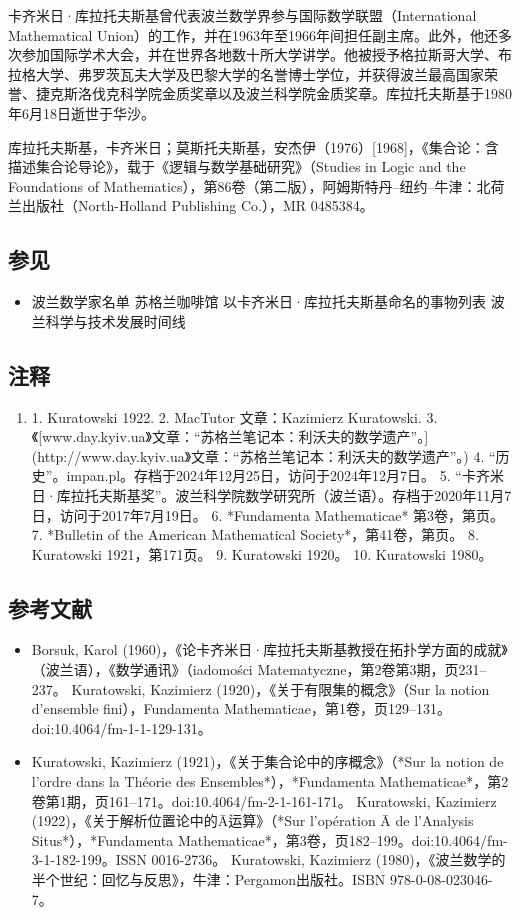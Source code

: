 卡齐米日·库拉托夫斯基曾代表波兰数学界参与国际数学联盟（International Mathematical Union）的工作，并在1963年至1966年间担任副主席。此外，他还多次参加国际学术大会，并在世界各地数十所大学讲学。他被授予格拉斯哥大学、布拉格大学、弗罗茨瓦夫大学及巴黎大学的名誉博士学位，并获得波兰最高国家荣誉、捷克斯洛伐克科学院金质奖章以及波兰科学院金质奖章。库拉托夫斯基于1980年6月18日逝世于华沙。

库拉托夫斯基，卡齐米日；莫斯托夫斯基，安杰伊（1976）[1968]，《集合论：含描述集合论导论》，载于《逻辑与数学基础研究》（Studies in Logic and the Foundations of Mathematics），第86卷（第二版），阿姆斯特丹–纽约–牛津：北荷兰出版社（North-Holland Publishing Co.），MR 0485384。
\subsection{参见}
\begin{itemize}
\item 波兰数学家名单
苏格兰咖啡馆
以卡齐米日·库拉托夫斯基命名的事物列表
波兰科学与技术发展时间线
\end{itemize}
\subsection{注释}
\begin{enumerate}
\item 1. Kuratowski 1922.
2. MacTutor 文章：Kazimierz Kuratowski.
3. 《[www.day.kyiv.ua》文章：“苏格兰笔记本：利沃夫的数学遗产”。](http://www.day.kyiv.ua》文章：“苏格兰笔记本：利沃夫的数学遗产”。)
4. “历史”。impan.pl。存档于2024年12月25日，访问于2024年12月7日。
5. “卡齐米日·库拉托夫斯基奖”。波兰科学院数学研究所（波兰语）。存档于2020年11月7日，访问于2017年7月19日。
6. *Fundamenta Mathematicae* 第3卷，第页。
7. *Bulletin of the American Mathematical Society*，第41卷，第页。
8. Kuratowski 1921，第171页。
9. Kuratowski 1920。
10. Kuratowski 1980。
\end{enumerate}
\subsection{参考文献}
\begin{itemize}
\item Borsuk, Karol (1960)，《论卡齐米日·库拉托夫斯基教授在拓扑学方面的成就》（波兰语），《数学通讯》（iadomości Matematyczne，第2卷第3期，页231–237。
Kuratowski, Kazimierz (1920)，《关于有限集的概念》（Sur la notion d'ensemble fini），Fundamenta Mathematicae，第1卷，页129–131。doi:10.4064/fm-1-1-129-131。
\item Kuratowski, Kazimierz (1921)，《关于集合论中的序概念》（*Sur la notion de l'ordre dans la Théorie des Ensembles*），*Fundamenta Mathematicae*，第2卷第1期，页161–171。doi:10.4064/fm-2-1-161-171。
Kuratowski, Kazimierz (1922)，《关于解析位置论中的Ā运算》（*Sur l'opération Ā de l'Analysis Situs*），*Fundamenta Mathematicae*，第3卷，页182–199。doi:10.4064/fm-3-1-182-199。ISSN 0016-2736。
Kuratowski, Kazimierz (1980)，《波兰数学的半个世纪：回忆与反思》，牛津：Pergamon出版社。ISBN 978-0-08-023046-7。
\end{itemize}

